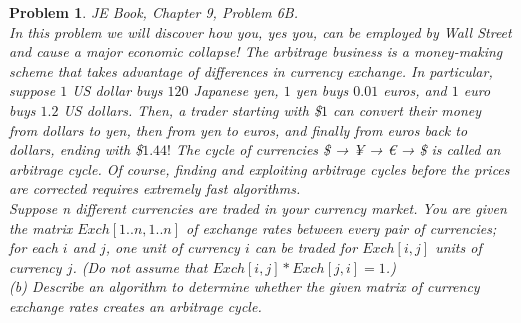 \documentclass[12pt]{article}
\newtheorem{problem}{Problem}
\begin{document}
\begin{problem}
 JE Book, Chapter 9, Problem 6B. \\
 \indent In this problem we will discover how you, yes you, can be employed by Wall Street and cause a major economic collapse! The arbitrage business is a money-making scheme that takes advantage of differences in currency exchange. In particular, suppose $1$ US dollar buys $120$ Japanese yen, $1$ yen buys $0.01$ euros, and $1$ euro buys $1.2$ US dollars. Then, a trader starting with \$$1$ can convert their money from dollars to yen, then from yen to euros, and finally from euros back to dollars, ending with \$$1.44!$ The cycle of currencies \$ → ¥ → € → \$ is called an arbitrage cycle. Of course, finding and exploiting arbitrage cycles before the prices are corrected requires extremely fast algorithms.
\\ \indent Suppose n different currencies are traded in your currency market. You are given the matrix $Exch[1 .. n, 1 .. n]$ of exchange rates between every pair of currencies; for each $i$ and $j$, one unit of currency $i$ can be traded for $Exch[i, j]$ units of currency $j$. (Do not assume that $Exch[i, j] * Exch[ j, i] = 1$.)
\\ \indent (b) Describe an algorithm to determine whether the given matrix of currency exchange rates creates an arbitrage cycle.
\end{problem}

\end{document}
